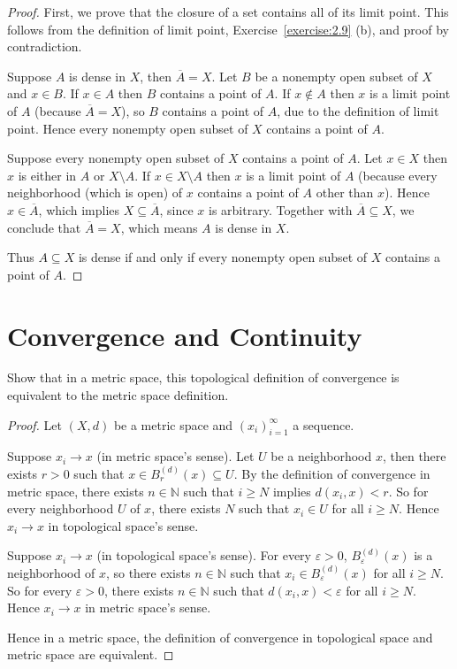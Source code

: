 \begin{proof}
	First, we prove that the closure of a set contains all of its limit point. This follows from the definition of limit point, Exercise~\ref{exercise:2.9} (b), and proof by contradiction.

	Suppose $A$ is dense in $X$, then $\overline{A} = X$. Let $B$ be a nonempty open subset of $X$ and $x\in B$. If $x\in A$ then $B$ contains a point of $A$. If $x\notin A$ then $x$ is a limit point of $A$ (because $\overline{A} = X$), so $B$ contains a point of $A$, due to the definition of limit point. Hence every nonempty open subset of $X$ contains a point of $A$.

	Suppose every nonempty open subset of $X$ contains a point of $A$. Let $x\in X$ then $x$ is either in $A$ or $X\setminus A$. If $x\in X\setminus A$ then $x$ is a limit point of $A$ (because every neighborhood (which is open) of $x$ contains a point of $A$ other than $x$). Hence $x\in \overline{A}$, which implies $X\subseteq \overline{A}$, since $x$ is arbitrary. Together with $\overline{A}\subseteq X$, we conclude that $\overline{A} = X$, which means $A$ is dense in $X$.

	Thus $A\subseteq X$ is dense if and only if every nonempty open subset of $X$ contains a point of $A$.
\end{proof}

\section*{Convergence and Continuity}

\begin{exercise}{2.12}
	Show that in a metric space, this topological definition of convergence is equivalent to the metric space definition.
\end{exercise}

\begin{proof}
	Let $(X, d)$ be a metric space and ${(x_{i})}^{\infty}_{i=1}$ a sequence.

	Suppose $x_{i}\to x$ (in metric space's sense). Let $U$ be a neighborhood $x$, then there exists $r > 0$ such that $x\in B^{(d)}_{r}(x)\subseteq U$. By the definition of convergence in metric space, there exists $n\in\mathbb{N}$ such that $i\geq N$ implies $d(x_{i}, x) < r$. So for every neighborhood $U$ of $x$, there exists $N$ such that $x_{i}\in U$ for all $i\geq N$. Hence $x_{i}\to x$ in topological space's sense.

	Suppose $x_{i}\to x$ (in topological space's sense). For every $\varepsilon > 0$, $B^{(d)}_{\varepsilon}(x)$ is a neighborhood of $x$, so there exists $n\in\mathbb{N}$ such that $x_{i}\in B^{(d)}_{\varepsilon}(x)$ for all $i\geq N$. So for every $\varepsilon > 0$, there exists $n\in\mathbb{N}$ such that $d(x_{i}, x) < \varepsilon$ for all $i\geq N$. Hence $x_{i}\to x$ in metric space's sense.

	Hence in a metric space, the definition of convergence in topological space and metric space are equivalent.
\end{proof}

